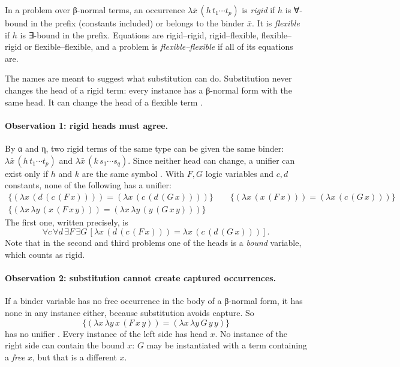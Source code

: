 {\begin{definition}\label{def:lambda-rigid}
In a problem over β-normal terms, an occurrence $\lambda\bar x\,(h\,t_1\cdots t_p)$ is \emph{rigid} if
$h$ is ∀-bound in the prefix (constants included) or belongs to the binder $\bar x$. It is
\emph{flexible} if $h$ is ∃-bound in the prefix. Equations are rigid–rigid, rigid–flexible,
flexible–rigid or flexible–flexible, and a problem is \emph{flexible–flexible} if all of its equations
are.
\end{definition}
The names are meant to suggest what substitution can do. Substitution never changes the head of a rigid
term: every instance has a β-normal form with the same head. It can change the head of a flexible term
.

\paragraph{Observation 1: rigid heads must agree.} By α and η, two rigid terms of the same type can be
given the same binder: $\lambda\bar x\,(h\,t_1\cdots t_p)$ and $\lambda\bar x\,(k\,s_1\cdots s_q)$. Since
neither head can change, a unifier can exist only if $h$ and $k$ are the same symbol . With $F,G$
logic variables and $c,d$ constants, none of the following has a unifier:
\begin{gather*}
  \{(\lambda x\,(d\,(c\,(F\,x))))=(\lambda x\,(c\,(d\,(G\,x))))\}\qquad
  \{(\lambda x\,(x\,(F\,x)))=(\lambda x\,(c\,(G\,x)))\}\\
  \{(\lambda x\,\lambda y\,(x\,(F\,x\,y)))=(\lambda x\,\lambda y\,(y\,(G\,x\,y)))\}
\end{gather*}
The first one, written precisely, is
\[\forall c\,\forall d\,\exists F\,\exists G\,[\lambda x\,(d\,(c\,(F\,x)))=\lambda x\,(c\,(d\,(G\,x)))].\]
Note that in the second and third problems one of the heads is a \emph{bound} variable, which counts as
rigid.

\paragraph{Observation 2: substitution cannot create captured occurrences.} If a binder variable has
no free occurrence in the body of a β-normal form, it has none in any instance either, because
substitution avoids capture. So
\[
  \{(\lambda x\,\lambda y\,x\,(F\,x\,y))=(\lambda x\,\lambda y\,G\,y\,y)\}
\]
has no unifier . Every instance of the left side has head $x$. No instance of the right
side can contain the bound $x$: $G$ may be instantiated with a term containing a \emph{free} $x$, but
that is a different $x$.

}

